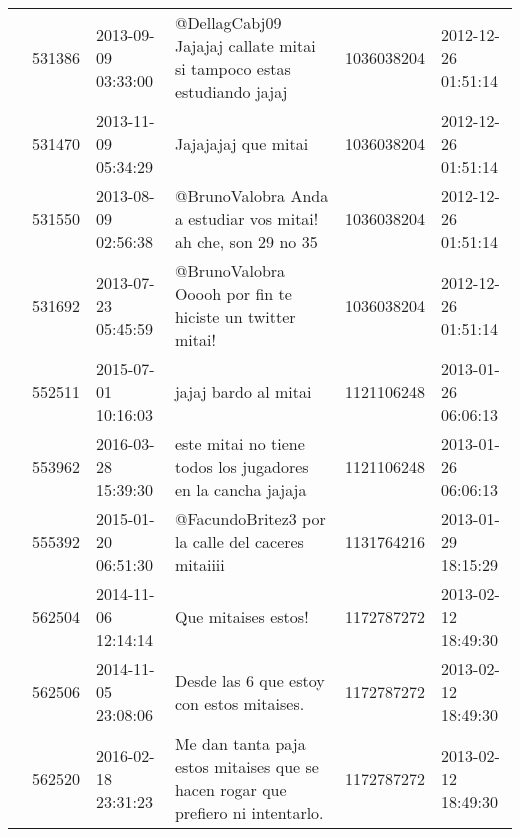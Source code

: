 \begin{tabular}{llllrl}
           & 531386  & 2013-09-09 03:33:00 &                                                                        @DellagCabj09 Jajajaj callate mitai si tampoco estas estudiando jajaj &  1036038204 & 2012-12-26 01:51:14 \\
           & 531470  & 2013-11-09 05:34:29 &                                                                                                                          Jajajajaj que mitai &  1036038204 & 2012-12-26 01:51:14 \\
           & 531550  & 2013-08-09 02:56:38 &                                                                                @BrunoValobra Anda a estudiar vos mitai! ah che, son 29 no 35 &  1036038204 & 2012-12-26 01:51:14 \\
           & 531692  & 2013-07-23 05:45:59 &                                                                                     @BrunoValobra Ooooh por fin te hiciste un twitter mitai! &  1036038204 & 2012-12-26 01:51:14 \\
           & 552511  & 2015-07-01 10:16:03 &                                                                                                                         jajaj bardo al mitai &  1121106248 & 2013-01-26 06:06:13 \\
           & 553962  & 2016-03-28 15:39:30 &                                                                                  este mitai no tiene todos los jugadores en la cancha jajaja &  1121106248 & 2013-01-26 06:06:13 \\
           & 555392  & 2015-01-20 06:51:30 &                                                                                            @FacundoBritez3 por la calle del caceres mitaiiii &  1131764216 & 2013-01-29 18:15:29 \\
           & 562504  & 2014-11-06 12:14:14 &                                                                                                                          Que mitaises estos! &  1172787272 & 2013-02-12 18:49:30 \\
           & 562506  & 2014-11-05 23:08:06 &                                                                                                    Desde las 6 que estoy con estos mitaises. &  1172787272 & 2013-02-12 18:49:30 \\
           & 562520  & 2016-02-18 23:31:23 &                                                              Me dan tanta paja estos mitaises que se hacen rogar que prefiero ni intentarlo. &  1172787272 & 2013-02-12 18:49:30 \\

\end{tabular}
